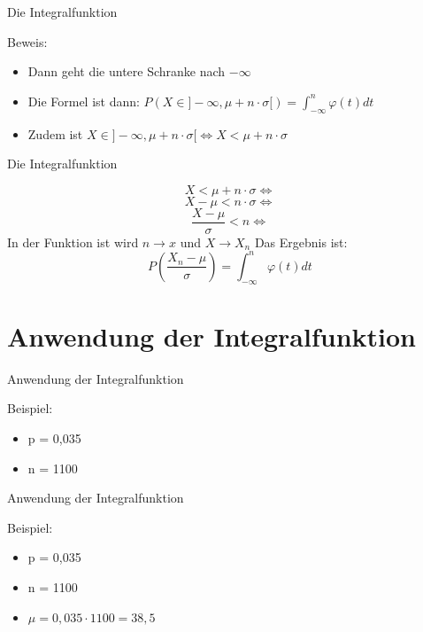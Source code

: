 \documentclass[14pt]{beamer}
\begin{document}
\begin{frame} {Die Integralfunktion}

Beweis:

 \begin{itemize}
  \item Dann geht die untere Schranke nach $ - \infty $
  \item Die Formel ist dann: $ P(X \in ] -\infty, \mu + n \cdot \sigma[) = \int_{-\infty}^n\varphi(t)dt $
  \item Zudem ist $ X \in ]-\infty, \mu + n \cdot \sigma[ \Leftrightarrow X < \mu + n \cdot \sigma $
 \end{itemize}

\end{frame}

\begin{frame} {Die Integralfunktion}

 $$ X < \mu + n \cdot \sigma \Leftrightarrow $$ $$ X - \mu < n \cdot \sigma \Leftrightarrow $$ $$ \frac{X - \mu}{\sigma} < n \Leftrightarrow $$
 In der Funktion ist wird $ n \rightarrow x $ und $ X \rightarrow X_n $
 Das Ergebnis ist:
 $$ P\left(\frac{X_n - \mu}{\sigma}\right) = \int_{-\infty}^n\varphi(t)dt  $$

\end{frame}

\section{Anwendung der Integralfunktion}
\begin{frame} {Anwendung der Integralfunktion}

Beispiel:
\begin{itemize}
 \item p = 0,035
 \item n = 1100
\end{itemize}

\end{frame}

\begin{frame} {Anwendung der Integralfunktion}

Beispiel:
\begin{itemize}
 \item p = 0,035
 \item n = 1100
 \item $\mu = 0,035 \cdot 1100 = 38,5 $
\end{itemize}

\end{frame}
\end{document}

